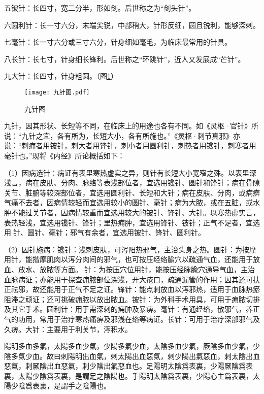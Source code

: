\documentclass[12pt]{ctexbook}%
\begin{document}
五铍针：长四寸，宽二分半，形如剑。后世称之为“剑头针”。

六圆利针：长一寸六分，末端尖锐，中部稍大，针形反细，圆且锐利，能够深刺。

七毫针：长一寸六分或三寸六分，针身细如毫毛，为临床最常用的针具。

八长针：长七寸，针身细长锋利。后世称之“环跳针”，近人又发展成“芒针”。

九大针：长四寸，针身粗圆。（图\ref{fig:九针图}）

\begin{figure}[htb]
  \centering
  \texttt{[image: 九针图.pdf]}\\
  \caption{九针图}\label{fig:九针图}
\end{figure}



九针，因其形状、长短等不同，在临床上的用途也各有不同。如《灵枢·官针》所说：“九针之宜，各有所为，长短大小，各有所施也。”《灵枢·刺节真邪》亦说：“刺痈者用铍针，刺大者用锋针，刺小者用圆利针，刺热者用镵针，刺寒者用毫针也。”现将《内经》所论概括如下：

（1）因病选针：病证有表里寒热虚实之异，则针有长短大小宽窄之殊。以表里深浅言，病在皮肤、分肉、脉络等表浅部位者，宜选用镵针、圆针和锋针；病在骨隙关节、脏腑等较深部位者，宜选用圆利针、长短和大针；病在皮肤、分肉，或病痹气痛不去者，因病情较轻而宜选用较小的圆针、毫针；病为大脓，或在五脏，或水肿不能过关节者，因病情较重而宜选用较大的铍针、锋针、大针。以寒热虚实言，表热轻浅，宜选用镵针、锋针；里热痈肿，宜选用锋针、铍针；正气不足者，宜选用𫔂针、圆针、毫针；邪气有余者，宜选用铍针、锋针、圆利针。

（2）因针施病：镵针：浅刺皮肤，可泻阳热邪气，主治头身之热。圆针：为按摩用针，能揩摩肌肉以泻分肉间的邪气，也可按压经络腧穴以疏通气血，还能用于放血、放水、放脓等方面。𫔂针：为按压穴位用针，能按压经脉腧穴通导气血，主治血脉病证；亦能用于探查痈脓部位深浅，开大疮口，疏通漏管的作用；因其还可扶正祛邪，故还能用于正气不足之证。锋针：能点刺放血以泻邪热，适用于血脉热瘀阻滞之顽证；还可挑破痈脓以放出脓血。铍针：为外科手术用具，可用于痈脓切排及其它手术。圆利针：用于需深刺的痈肿及暴痹。毫针：有通经络，散邪气，养正气的功用，常用于治疗寒热痛痹及邪浅在络等病证。长针：可用于治疗深部邪气及久痹。大针：主要用于利关节，泻积水。


\begin{yuanwen}
陽明多血多氣，太陽多血少氣，少陽多氣少血，太陰多血少氣，厥陰多血少氣，少陰多氣少血。故曰刺陽明出血氣，刺太陽出血惡氣，刺少陽出氣惡血，刺太陰出血惡氣，刺厥陰出血惡氣，刺少陰出氣惡血也。足陽明太陰爲表裏，少陽厥陰爲表裏，太陽少陰爲表裏，是謂足之陰陽也。手陽明太陰爲表裏，少陽心主爲表裏，太陽少陰爲表裏，是謂手之陰陽也。
\end{yuanwen}
\end{document}
